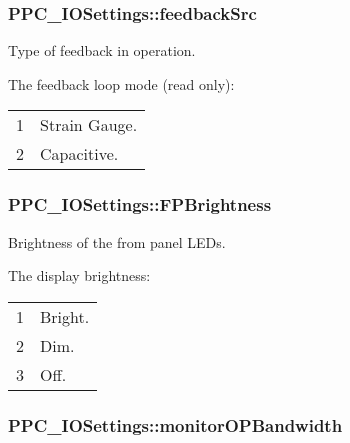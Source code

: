 \subsubsection[{\texorpdfstring{feedback\+Src}{feedbackSrc}}]{ P\+P\+C\+\_\+\+I\+O\+Settings\+::feedback\+Src}\hypertarget{struct_p_p_c___i_o_settings_aba2cf51fb81d7c62d45b71a6da271a50}{}\label{struct_p_p_c___i_o_settings_aba2cf51fb81d7c62d45b71a6da271a50}


Type of feedback in operation. 

The feedback loop mode (read only)\+: \tabulinesep=1mm
\begin{longtabu} spread 0pt [c]{*2{|X[-1]}|}
&Strain Gauge. \\
2&Capacitive. \\
\end{longtabu}
\subsubsection[{\texorpdfstring{F\+P\+Brightness}{FPBrightness}}]{ P\+P\+C\+\_\+\+I\+O\+Settings\+::\+F\+P\+Brightness}\hypertarget{struct_p_p_c___i_o_settings_a8f2fdcfdda023028d3a662b9db82247e}{}\label{struct_p_p_c___i_o_settings_a8f2fdcfdda023028d3a662b9db82247e}


Brightness of the from panel L\+ED\textquotesingle{}s. 

The display brightness\+: \tabulinesep=1mm
\begin{longtabu} spread 0pt [c]{*2{|X[-1]}|}
&Bright. \\
2&Dim. \\
3&Off. \\
\end{longtabu}
\subsubsection[{\texorpdfstring{monitor\+O\+P\+Bandwidth}{monitorOPBandwidth}}]{ P\+P\+C\+\_\+\+I\+O\+Settings\+::monitor\+O\+P\+Bandwidth}\hypertarget{struct_p_p_c___i_o_settings_a7438940f9ae0e57eef2c4199c40aa0b0}{}\label{struct_p_p_c___i_o_settings_a7438940f9ae0e57eef2c4199c40aa0b0}


